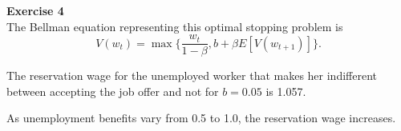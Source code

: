 \documentclass[letterpaper,12pt]{article}
\theoremstyle{definition}
\begin{document}
\textbf{Exercise 4} \\
The Bellman equation representing this optimal stopping problem is
\begin{equation*}
  V(w_t) = \max\{\frac{w_t}{1-\beta}, b + \beta E[V(w_{t+1})]\} .
\end{equation*}

\begin{figure}[H]\centering\captionsetup{width=0in}
\end{figure}

The reservation wage for the unemployed worker that makes her indifferent between accepting the job offer and not for $b = 0.05$ is 1.057.

\begin{figure}[H]\centering\captionsetup{width=0in}
\end{figure}

As unemployment benefits vary from 0.5 to 1.0, the reservation wage increases.
\end{document}
